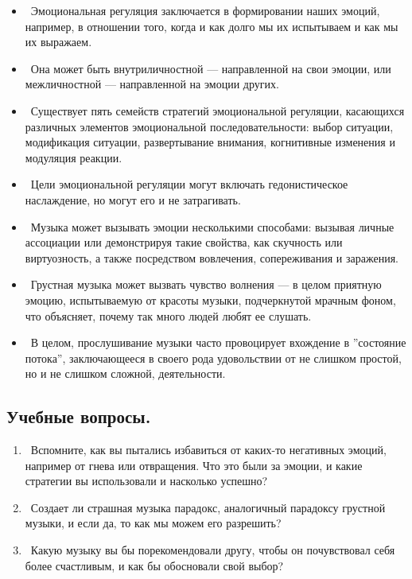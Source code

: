 \documentclass[11pt]{book}
\begin{document}
\begin{itemize}
  \item\ Эмоциональная регуляция заключается в формировании наших эмоций, например, в отношении того, когда и как долго мы их испытываем и как мы их выражаем.
  \item\ Она может быть внутриличностной --- направленной на свои эмоции, или межличностной --- направленной на эмоции других.
  \item\ Существует пять семейств стратегий эмоциональной регуляции, касающихся различных элементов эмоциональной последовательности: выбор ситуации, модификация ситуации, развертывание внимания, когнитивные изменения и модуляция реакции.
  \item\ Цели эмоциональной регуляции могут включать гедонистическое наслаждение, но могут его и не затрагивать.
  \item\ Музыка может вызывать эмоции несколькими способами: вызывая личные ассоциации или демонстрируя такие свойства, как скучность или виртуозность, а также посредством вовлечения, сопереживания и заражения.
  \item\ Грустная музыка может вызвать чувство волнения --- в целом приятную эмоцию, испытываемую от красоты музыки, подчеркнутой мрачным фоном, что объясняет, почему так много людей любят ее слушать.
  \item\ В целом, прослушивание музыки часто провоцирует вхождение в ''состояние потока'', заключающееся в своего рода удовольствии от не слишком простой, но и не слишком сложной, деятельности.
\end{itemize}

\begin{tcolorbox}
  \section{Учебные вопросы.}
  \begin{enumerate}
    \item\ Вспомните, как вы пытались избавиться от каких-то негативных эмоций, например от гнева или отвращения. Что это были за эмоции, и какие стратегии вы использовали и насколько успешно?
    \item\ Создает ли страшная музыка парадокс, аналогичный парадоксу грустной музыки, и если да, то как мы можем его разрешить?
    \item\ Какую музыку вы бы порекомендовали другу, чтобы он почувствовал себя более счастливым, и как бы обосновали свой выбор?
  \end{enumerate}
\end{tcolorbox}
\end{document}
